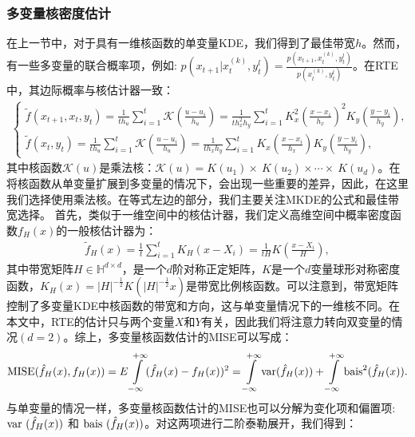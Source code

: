 \subsubsection{多变量核密度估计}
在上一节中，对于具有一维核函数的单变量KDE，我们得到了最佳带宽$h$。然而，有一些多变量的联合概率项，例如: $p(x_{t+1}| x_{t}^{(k)},y_{t}^{l}) = \frac{p(x_{t+1}, x_{t}^{(k)},y_{t}^{l})}{p(x_{t}^{(k)},y_{t}^{l})}$。在RTE中，其边际概率与核估计器一致：
\begin{align}\label{marginal}
\begin{cases}
\tilde{f}(x_{t+1},x_{t},y_{t}) =\frac{1}{th_{u}}\sum\limits^{t}_{i=1}\mathcal{K}(\frac{u-u_{i}}{h_{u}})=\frac{1}{th_{x}^{2}h_{y}}\sum\limits^{t}_{i=1}K_{x}^{2}(\frac{x-x_{i}}{h_{x}})^{2}K_{y}(\frac{y-y_{i}}{h_{y}}),\\[0.5em]
\tilde{f}(x_{t},y_{t}) =\frac{1}{th_{u}}\sum\limits^{t}_{i=1}\mathcal{K}(\frac{u-u_{i}}{h_{u}})=\frac{1}{th_{x}h_{y}}\sum\limits^{t}_{i=1}K_{x}(\frac{x-x_{i}}{h_{x}})K_{y}(\frac{y-y_{i}}{h_{y}}),
\end{cases}
\end{align}
其中核函数$\mathcal{K}(u)$是乘法核：$\mathcal{K}(u)=K(u_{1})\times\ K(u_{2})\times\cdots \times\ K(u_{d})$。在将核函数从单变量扩展到多变量的情况下，会出现一些重要的差异，因此，在这里我们选择使用乘法核。在等式左边的部分，我们主要关注MKDE的公式和最佳带宽选择。
首先，类似于一维空间中的核估计器，我们定义高维空间中概率密度函数$f_{H}(x)$的一般核估计器为：
\begin{align}\label{MKernelformula}
\tilde{f}_{H}(x) =\frac{1}{t}\sum\limits^{t}_{i=1}K_{H}(x-X_{i})
            =\frac{1}{tH}K\left(\frac{x-X_{i}}{H}\right),
\end{align}
其中带宽矩阵$H \in \mathbb{H}^{d\times d}$，是一个$d$阶对称正定矩阵，$K$是一个$d$变量球形对称密度函数，$K_{H}(x) = |H|^{-\frac{1}{2}}K(|H|^{-\frac{1}{2}}x)$是带宽比例核函数。可以注意到，带宽矩阵控制了多变量KDE中核函数的带宽和方向，这与单变量情况下的一维核不同。在本文中，RTE的估计只与两个变量$X$和$Y$有关，因此我们将注意力转向双变量的情况$(d=2)$。综上，多变量核函数估计的MISE可以写成：
\begin{align}\label{MMISEformula}
{\rm MISE}(\hat{f}_{H}(x), f_{H}(x)) = E\int\limits_{-\infty}^{+\infty}(\hat{f}_{H}(x)-f_{H}(x))^{2}
=\int\limits_{-\infty}^{+\infty}{\rm var} (\hat{f}_{H}(x)) + \int\limits_{-\infty}^{+\infty}{\rm bais}^{2}(\hat{f}_{H}(x)).
\end{align}
与单变量的情况一样，多变量核函数估计的MISE也可以分解为变化项和偏置项:${\rm var}\ (\hat{f}_{H}(x))$ 和 ${\rm bais}\ (\hat{f}_{H}(x))$。对这两项进行二阶泰勒展开，我们得到：
